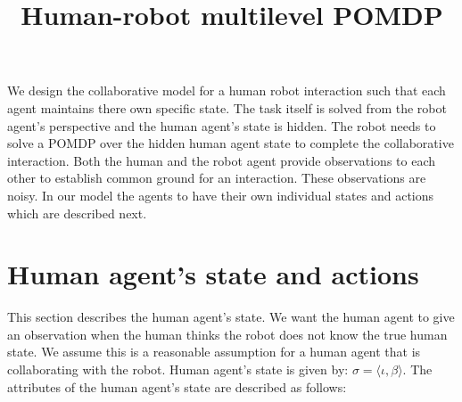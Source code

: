 \documentclass{article}
\title{Human-robot multilevel POMDP}
\date{}
\begin{document}
\maketitle
We design the collaborative model for a human robot interaction such that each agent maintains there own specific state. 
The task itself is solved from the robot agent's perspective and the human agent's state is hidden. 
The robot needs to solve a POMDP over the hidden human agent state to complete the collaborative interaction. 
Both the human and the robot agent provide observations to each other to establish common ground for an interaction. These observations are noisy. 
In our model the agents to have their own individual states and actions which are described next.

\section{Human agent's state and actions}
This section describes the human agent's state. We want the human agent to give an observation when the human thinks the robot does not know the true human state. We assume this is a reasonable assumption for a human agent that is collaborating with the robot. Human agent's state is given by: $\sigma = \langle \iota, \beta\rangle$. The attributes of the human agent's state are described as follows:
\end{document}
